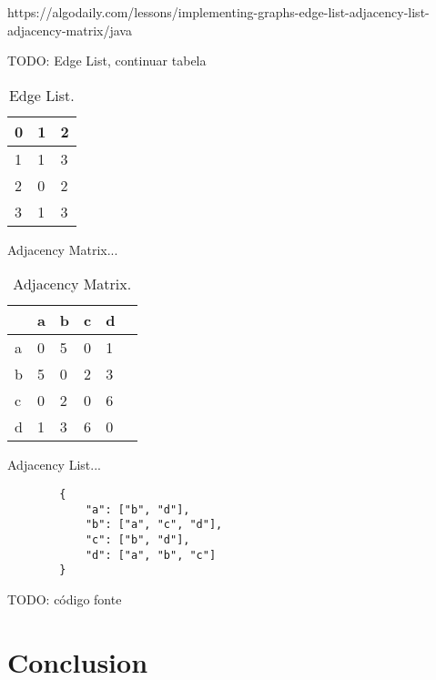 \documentclass[a4paper]{article}
\begin{document}
    https://algodaily.com/lessons/implementing-graphs-edge-list-adjacency-list-adjacency-matrix/java
    

    TODO: Edge List, continuar tabela

    \begin{table}[H]
        \centering
        \caption{\label{tab:edge-list}Edge List.}
        \vspace*{10pt}
        \begin{tabular}{ |l|l|l| } 
            \hline
            0   & 1 & 2 \\
            \hline
            1   & 1 & 3 \\
            \hline
            2   & 0 & 2 \\
            \hline
            3   & 1 & 3 \\
            \hline
        \end{tabular}
    \end{table}


    Adjacency Matrix...

        
    \begin{table}[H]
        \centering
        \caption{\label{tab:adjacency-matrix}Adjacency Matrix.}
        \vspace*{10pt}
        \begin{tabular}{ l|l|l|l|l|l| } 
                & a & b & c & d \\
            \hline
            a   & 0 & 5 & 0 & 1 \\
            b   & 5 & 0 & 2 & 3 \\
            c   & 0 & 2 & 0 & 6 \\
            d   & 1 & 3 & 6 & 0 \\
            \hline
        \end{tabular}
    \end{table}



    Adjacency List...

    \begin{verbatim}
        { 
            "a": ["b", "d"],
            "b": ["a", "c", "d"],
            "c": ["b", "d"],
            "d": ["a", "b", "c"]
        }
    \end{verbatim}


    TODO: código fonte

    \section*{Conclusion}

    
     
\end{document}

